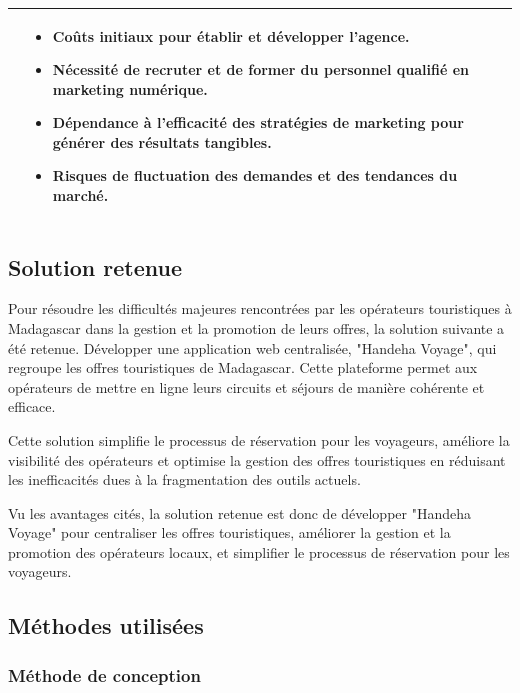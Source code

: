 \documentclass[12pt]{report}
\begin{document}
\begin{table}[h]
{\begin{tabular}{|p{5cm}|p{5cm}|p{5cm}|}
\begin{itemize}
						\end{itemize}
						&
						\begin{itemize}
							\item Coûts initiaux pour établir et développer l'agence.
							\item Nécessité de recruter et de former du personnel qualifié en marketing numérique.
							\item Dépendance à l'efficacité des stratégies de marketing pour générer des résultats tangibles.
							\item Risques de fluctuation des demandes et des tendances du marché.
						\end{itemize}\\						

						\hline
				    \end{tabular}
				  }
				\end{table}
				\clearpage
				\subsection{Solution retenue}

				\hspace{15pt} Pour résoudre les difficultés majeures rencontrées par les opérateurs touristiques à Madagascar dans la gestion et la promotion de leurs offres, la solution suivante a été retenue. Développer une application web centralisée, "Handeha Voyage", qui regroupe les offres touristiques de Madagascar. Cette plateforme permet aux opérateurs de mettre en ligne leurs circuits et séjours de manière cohérente et efficace.

				Cette solution simplifie le processus de réservation pour les voyageurs, améliore la visibilité des opérateurs et optimise la gestion des offres touristiques en réduisant les inefficacités dues à la fragmentation des outils actuels.

				Vu les avantages cités, la solution retenue est donc de développer "Handeha Voyage" pour centraliser les offres touristiques, améliorer la gestion et la promotion des opérateurs locaux, et simplifier le processus de réservation pour les voyageurs.

				\subsection{Méthodes utilisées}
				\subsubsection{Méthode de conception}
\end{document}
